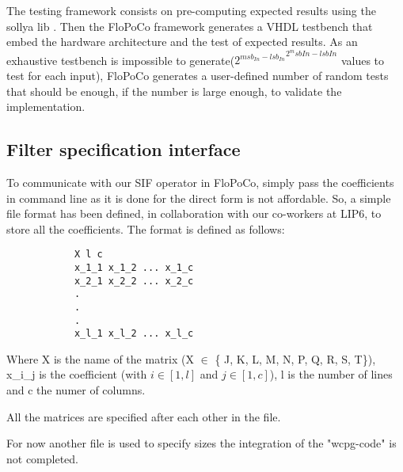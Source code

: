 	The testing framework consists on pre-computing expected results using the sollya lib \cite{ChevillardJoldesLauter2010}.
	Then the FloPoCo framework generates a VHDL testbench that embed the hardware architecture and the test of expected results.
	As an exhaustive testbench is impossible to generate(${2^{msb_{In} - lsb_{In}}}^{2^msb{In} - lsb{In}}$ values to test for each input),
	FloPoCo generates a user-defined number of random tests that should be enough, if the number is large enough, to validate the implementation.

		\subsection{Filter specification interface}
		To communicate with our SIF operator in FloPoCo, simply pass the coefficients in command line as it is done for the direct form is not affordable.
		So, a simple file format has been defined, in collaboration with our co-workers at LIP6, to store all the coefficients.
		The format is defined as follows:

		\begin{verbatim}
			X l c
			x_1_1 x_1_2 ... x_1_c
			x_2_1 x_2_2 ... x_2_c
			.
			.
			.
			x_l_1 x_l_2 ... x_l_c
		\end{verbatim}

		Where X is the name of the matrix (X $\in$ \{ J, K, L, M, N, P, Q, R, S, T\}), x\_i\_j is the coefficient (with $i \in [1, l]$ and $j \in [1, c]$), l is the number of lines and c the numer of columns.

		All the matrices are specified after each other in the file.

		For now another file is used to specify sizes the integration of the "wcpg-code" is not completed.




